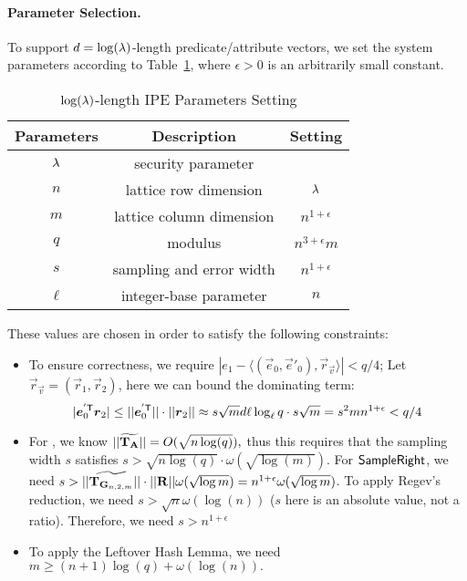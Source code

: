 \paragraph{Parameter Selection.}
To support $d = \log(\lambda)$-length predicate/attribute vectors, we set the system parameters according to Table~\ref{tab1}, where $\epsilon > 0$ is an arbitrarily small constant.
\vspace{-1em}
  \begin{table}[H]
  \centering
  \begin{tabular}{| c | c | c |}
   \hline
   Parameters & Description & Setting \\ \hline
   $\lambda$ & security parameter &  \\ \hline
   $n$ & lattice row dimension & $ \lambda$  \\ \hline
   $m$ & lattice column dimension & $ n^{1+\epsilon}$ \\ \hline
   $q$ & modulus & $n^{3+\epsilon}m$ \\ \hline
   $s$ & sampling and error width & $n^{1 + \epsilon} $ \\ \hline
   $\ell$ & integer-base parameter & $ n $ \\ \hline
   \end{tabular}
  \vspace{1em}
  \caption{$\log(\lambda)$-length IPE Parameters Setting}\label{tab1}
  \end{table}
  \vspace{-1em}
\noindent
 These values are chosen in order to satisfy the following constraints:
\begin{itemize}
\item To ensure correctness, we require $|e_1 - \langle (\vec{e}_0, \vec{e}'_0), \vec{r}_{\vec{v}} \rangle | < q/4$; Let $\vec{r}_{\vec{v}} = (\vec{r}_1, \vec{r}_2)$, here we can bound the dominating term:
$$ |\boldsymbol{e}_{0}^{'\mathsf{T}} \boldsymbol{r}_{2}| \leq || \boldsymbol{e}_{0}^{'\mathsf{T}}||  \cdot  ||\boldsymbol{r}_{2} || \approx  s \sqrt{m} d \ell \log_\ell q   \cdot s \sqrt{m}= s^2 m n^{1 + \epsilon} < q/4$$
\item For \sampleleft, we know $||\widetilde{\mathbf{T}_{\mathbf{A}}}|| = O(\sqrt{n\log(q)}),$ thus this requires that the sampling width $s$ satisfies $s > \sqrt{n\log(q)}\cdot\omega(\sqrt{\log(m)})$.
For $\mathsf{SampleRight}$, we need $s > ||\widetilde{\mathbf{T}_{\mathbf{G}_{n, 2, m}}}|| \cdot ||\mathbf{R}|| \omega(\sqrt{\log m}) = n^{1 + \epsilon} \omega(\sqrt{\log m})$.
To apply Regev's reduction, we need $s > \sqrt{n}\omega(\log(n))$ ($s$ here is an absolute value, not a ratio). Therefore, we need $s > n^{1 + \epsilon}$
\item To apply the Leftover Hash Lemma, we need $m\ge (n+1)\log(q) + \omega(\log(n)).$
\end{itemize}

